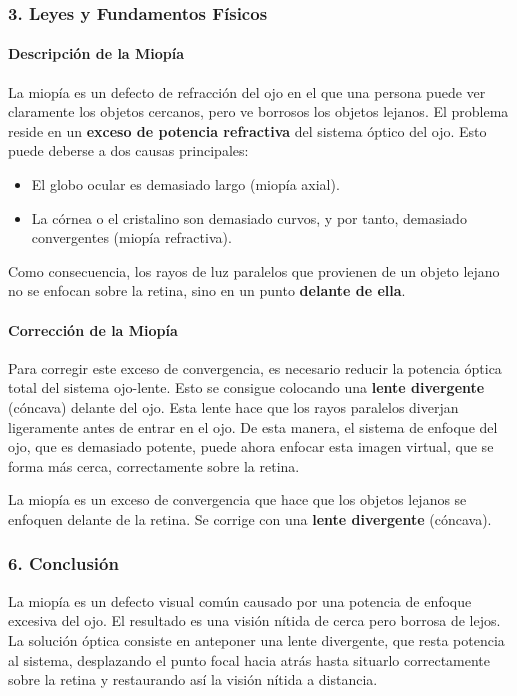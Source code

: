 \subsubsection*{3. Leyes y Fundamentos Físicos}
\paragraph*{Descripción de la Miopía}
La miopía es un defecto de refracción del ojo en el que una persona puede ver claramente los objetos cercanos, pero ve borrosos los objetos lejanos. El problema reside en un \textbf{exceso de potencia refractiva} del sistema óptico del ojo. Esto puede deberse a dos causas principales:
\begin{itemize}
    \item El globo ocular es demasiado largo (miopía axial).
    \item La córnea o el cristalino son demasiado curvos, y por tanto, demasiado convergentes (miopía refractiva).
\end{itemize}
Como consecuencia, los rayos de luz paralelos que provienen de un objeto lejano no se enfocan sobre la retina, sino en un punto \textbf{delante de ella}.

\paragraph*{Corrección de la Miopía}
Para corregir este exceso de convergencia, es necesario reducir la potencia óptica total del sistema ojo-lente. Esto se consigue colocando una \textbf{lente divergente} (cóncava) delante del ojo.
Esta lente hace que los rayos paralelos diverjan ligeramente antes de entrar en el ojo. De esta manera, el sistema de enfoque del ojo, que es demasiado potente, puede ahora enfocar esta imagen virtual, que se forma más cerca, correctamente sobre la retina.

\begin{cajaresultado}
La miopía es un exceso de convergencia que hace que los objetos lejanos se enfoquen delante de la retina. Se corrige con una \textbf{lente divergente} (cóncava).
\end{cajaresultado}

\subsubsection*{6. Conclusión}
\begin{cajaconclusion}
La miopía es un defecto visual común causado por una potencia de enfoque excesiva del ojo. El resultado es una visión nítida de cerca pero borrosa de lejos. La solución óptica consiste en anteponer una lente divergente, que resta potencia al sistema, desplazando el punto focal hacia atrás hasta situarlo correctamente sobre la retina y restaurando así la visión nítida a distancia.
\end{cajaconclusion}
\newpage

